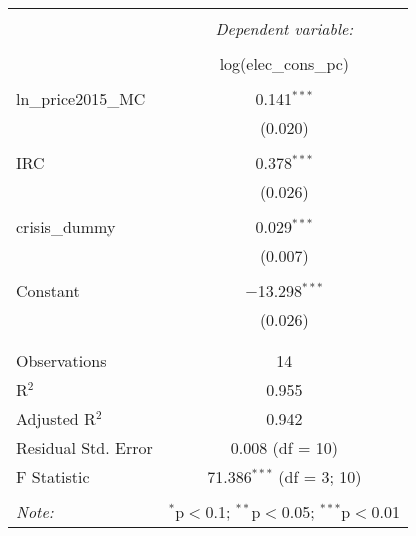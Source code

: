 
\begin{table}[!htbp] \centering 
  \caption{} 
  \label{} 
\begin{tabular}{@{\extracolsep{5pt}}lc} 
\\[-1.8ex]\hline 
\hline \\[-1.8ex] 
 & \multicolumn{1}{c}{\textit{Dependent variable:}} \\ 
\cline{2-2} 
\\[-1.8ex] & log(elec\_cons\_pc) \\ 
\hline \\[-1.8ex] 
 ln\_price2015\_MC & 0.141$^{***}$ \\ 
  & (0.020) \\ 
  & \\ 
 IRC & 0.378$^{***}$ \\ 
  & (0.026) \\ 
  & \\ 
 crisis\_dummy & 0.029$^{***}$ \\ 
  & (0.007) \\ 
  & \\ 
 Constant & $-$13.298$^{***}$ \\ 
  & (0.026) \\ 
  & \\ 
\hline \\[-1.8ex] 
Observations & 14 \\ 
R$^{2}$ & 0.955 \\ 
Adjusted R$^{2}$ & 0.942 \\ 
Residual Std. Error & 0.008 (df = 10) \\ 
F Statistic & 71.386$^{***}$ (df = 3; 10) \\ 
\hline 
\hline \\[-1.8ex] 
\textit{Note:}  & \multicolumn{1}{r}{$^{*}$p$<$0.1; $^{**}$p$<$0.05; $^{***}$p$<$0.01} \\ 
\end{tabular} 
\end{table} 
